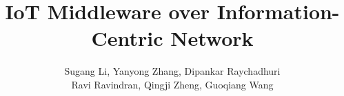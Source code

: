 \documentclass{sig-alternate-10pt}
\begin{document}
\title{IoT Middleware over Information-Centric Network}
\author{
\alignauthor 
Sugang Li, Yanyong Zhang, Dipankar Raychadhuri\\
Ravi Ravindran, Qingji Zheng, Guoqiang Wang\\
\\
\\
}
\maketitle







\end{document}
